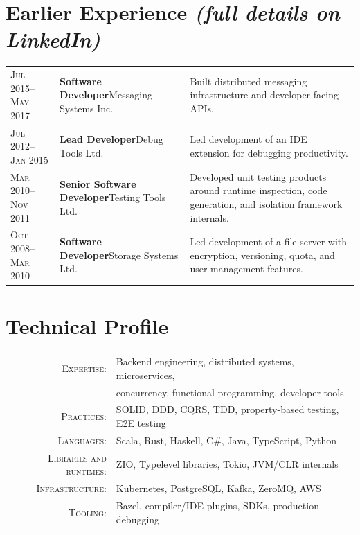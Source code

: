 \documentclass[a4paper,11pt]{article}
\begin{document}
\section{Earlier Experience \hfill{\normalfont\footnotesize\itshape (full details on LinkedIn)}}
\begin{longtable}{@{}p{}|p{}|p{}@{}}
  \textsc{Jul 2015--May 2017} & \textbf{Software Developer}\newline Messaging Systems Inc.
    &Built distributed messaging infrastructure and developer-facing APIs.
    \par\vspace{8pt} \\
  \textsc{Jul 2012--Jan 2015} & \textbf{Lead Developer}\newline Debug Tools Ltd.
    &Led development of an IDE extension for debugging productivity.
    \par\vspace{8pt} \\
  \textsc{Mar 2010--Nov 2011} & \textbf{Senior Software Developer}\newline Testing Tools Ltd.
    &Developed unit testing products around runtime inspection, code generation, and isolation framework internals.
    \par\vspace{8pt} \\
  \textsc{Oct 2008--Mar 2010} & \textbf{Software Developer}\newline Storage Systems Ltd.
    &Led development of a file server with encryption, versioning, quota, and user management features.
    \par\vspace{5pt}
\end{longtable}

\renewcommand{\arraystretch}{1.12}
\section{Technical Profile}
\begin{tabular}{rl}
  \textsc{Expertise:}& Backend engineering, distributed systems, microservices,\\
  &concurrency, functional programming, developer tools\\
  \textsc{Practices:}& SOLID, DDD, CQRS, TDD, property-based testing, E2E testing\\
  \textsc{Languages:}& Scala, Rust, Haskell, C\#, Java, TypeScript, Python\\
  \textsc{Libraries and runtimes:}& ZIO, Typelevel libraries, Tokio, JVM/CLR internals\\
  \textsc{Infrastructure:}& Kubernetes, PostgreSQL, Kafka, ZeroMQ, AWS\\
  \textsc{Tooling:}& Bazel, compiler/IDE plugins, SDKs, production debugging\\
\end{tabular}
\end{document}

